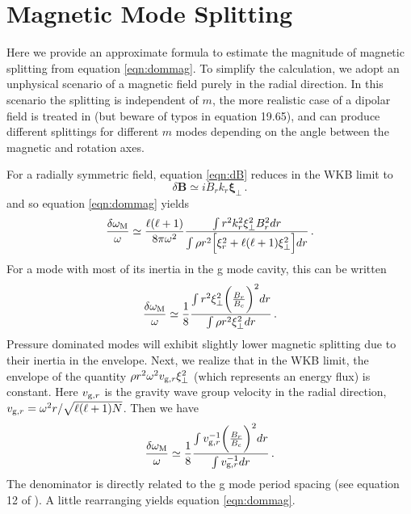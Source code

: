 \appendix

\section{Magnetic Mode Splitting}
\label{magmode}

Here we provide an approximate formula to estimate the magnitude of magnetic splitting from equation \ref{eqn:dommag}. To simplify the calculation, we adopt an unphysical scenario of a magnetic field purely in the radial direction. In this scenario the splitting is independent of $m$, the more realistic case of a dipolar field is treated in \cite{Unno_1989} (but beware of typos in equation 19.65), and can produce different splittings for different $m$ modes depending on the angle between the magnetic and rotation axes.

For a radially symmetric field, equation \ref{eqn:dB} reduces in the WKB limit to 
\begin{equation}
\delta {\boldsymbol B} \simeq i B_r k_r \boldsymbol{\xi}_\perp \, .
\end{equation}
and so equation \ref{eqn:dommag} yields
\begin{equation}
\label{eqn:dommag2}
\frac{\delta \omega_{\rm M}}{\omega} \simeq \frac{\ell(\ell+1)}{8 \pi \omega^2 } \frac{\int r^2 k_r^2 \xi_\perp^2 B_r^2 d r }{\int  \rho r^2 \Big[ \xi_r^2 + \ell(\ell+1) \xi_\perp^2 \Big] d r }\, .
\end{equation}
For a mode with most of its inertia in the g mode cavity, this can be written 
\begin{equation}
\label{eqn:dommag3}
\frac{\delta \omega_{\rm M}}{\omega} \simeq \frac{1}{8} \frac{\int r^2 \xi_\perp^2 \bigg(\frac{B_r}{B_c}\bigg)^2 d r }{\int \rho r^2 \xi_\perp^2 d r }\, .
\end{equation}
Pressure dominated modes will exhibit slightly lower magnetic splitting due to their inertia in the envelope. Next, we realize that in the WKB limit, the envelope of the quantity $\rho r^2 \omega^2 v_{{\rm g},r} \xi_\perp^2$ (which represents an energy flux) is constant. Here $v_{{\rm g},r}$ is the gravity wave group velocity in the radial direction, $v_{{\rm g},r} = \omega^2 r/\sqrt{\ell(\ell+1)N}$. Then we have
\begin{equation}
\label{eqn:dommag4}
\frac{\delta \omega_{\rm M}}{\omega} \simeq \frac{1}{8} \frac{\int v_{{\rm g},r}^{-1} \bigg(\frac{B_r}{B_c}\bigg)^2 d r }{\int v_{{\rm g},r}^{-1} d r }\, .
\end{equation}
The denominator is directly related to the g mode period spacing (see equation 12 of \cite{Chaplin_2013}). A little rearranging yields equation \ref{eqn:dommag}.

